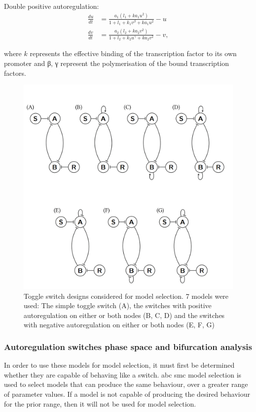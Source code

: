 \noindent Double positive autoregulation: 
\begin{align}\label{eq:gards_pos}
\frac{du}{dt} &= \frac{a_1  (l_1 + ka_{1}  u^{2}) }{1+l_1 + k_1  v^{\beta} + ka_{1}  u^{2}} - u \\
\frac{dv}{dt} &= \frac{a_2  (l_2 + ka_{2}  v^{2}) }{1+l_2 + k_2  u^{\gamma} + ka_{2}  v^{2}} - v,
\end{align}

\noindent where $k$ represents the effective binding of the transcription factor to its own promoter and β, γ represent the polymerisation of the bound transcription factors. 


\begin{figure}[tb]
	\begin{center}
\includegraphics[width=\textwidth]{../../chapters/chapterABCSysBio/images/toggle_switch_designs.png}
\caption[Model designs considered for model selection.]{\label{fig:toggle_switch_designs}Toggle switch designs considered for model selection. 7 models were used: The simple toggle switch (A), the switches with positive autoregulation on either or both nodes (B, C, D) and the switches with negative autoregulation on either or both nodes (E, F, G)}
\end{center}
\end{figure}
\clearpage

\subsubsection{Autoregulation switches phase space and bifurcation analysis}
\label{sec:models_bist_bif}
In order to use these models for model selection, it must first be determined whether they are capable of behaving like a switch. \acrshort{abc} \acrshort{smc} model selection is used to select models that can produce the same behaviour, over a greater range of parameter values. If a model is not capable of producing the desired behaviour for the prior range, then it will not be used for model selection.

